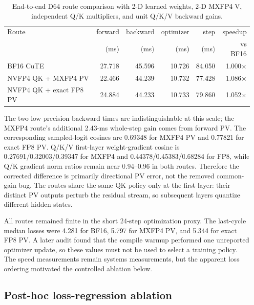 \begin{table}[htbp]
\centering
\caption{End-to-end D64 route comparison with 2-D learned weights, 2-D MXFP4
V, independent Q/K multipliers, and unit Q/K/V backward gains.}
\label{tab:d64-2d-route-comparison}
\small
\begin{tabular}{l rrr r r}
\toprule
Route & forward & backward & optimizer & step & speedup \\
 & (ms) & (ms) & (ms) & (ms) & vs BF16 \\
\midrule
BF16 CuTE                 & 27.718 & 45.596 & 10.726 & 84.050 & 1.000$\times$ \\
NVFP4 QK + MXFP4 PV       & 22.466 & 44.239 & 10.732 & 77.428 & 1.086$\times$ \\
NVFP4 QK + exact FP8 PV   & 24.884 & 44.233 & 10.733 & 79.860 & 1.052$\times$ \\
\bottomrule
\end{tabular}
\end{table}

The two low-precision backward times are indistinguishable at this scale; the
MXFP4 route's additional 2.43-ms whole-step gain comes from forward PV.  The
corresponding sampled-logit cosines are 0.69348 for MXFP4 PV and 0.77821 for
exact FP8 PV.  Q/K/V first-layer weight-gradient cosine is
0.27691/0.32003/0.39347 for MXFP4 and
0.44378/0.45383/0.68284 for FP8, while Q/K gradient norm ratios remain near
0.94--0.96 in both routes.  Therefore the corrected difference is primarily
directional PV error, not the removed common-gain bug.  The routes share the
same QK policy only at the first layer: their distinct PV outputs perturb the
residual stream, so subsequent layers quantize different hidden states.

All routes remained finite in the short 24-step optimization proxy.  The
last-cycle median losses were 4.281 for BF16, 5.797 for MXFP4 PV, and 5.344
for exact FP8 PV.  A later audit found that the compile warmup performed one
unreported optimizer update, so these values must not be used to select a
training policy.  The speed measurements remain systems measurements, but
the apparent loss ordering motivated the controlled ablation below.

\subsection{Post-hoc loss-regression ablation}
\label{sec:loss-regression-ablation}

